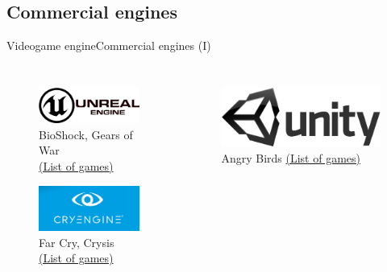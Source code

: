 \documentclass[10pt,compress]{beamer} %
\begin{document}
\subsection{Commercial engines}
\begin{frame}{Videogame engine}{Commercial engines (I)}
	\vspace{-0.2cm}
    \begin{columns}
		\vspace{-0.2cm}
   	 	\begin{figure}[t]
		\begin{center}
		    \includegraphics[width=0.8\linewidth]{figs/unreal}\\
			\small{BioShock, Gears of War\\
			\href{https://en.wikipedia.org/wiki/List_of_Unreal_Engine_games}{(List of games)}}

		    \includegraphics[width=0.8\linewidth]{figs/CRYENGINE}\\
			\small{Far Cry, Crysis\\
			\href{https://en.wikipedia.org/wiki/List_of_CryEngine_games}{(List of games)}
			}
		\end{center}
   	 	\end{figure}
		\vspace{-0.3cm}
   	 	\begin{figure}[t]
		\begin{center}
		    \includegraphics[width=0.8\linewidth]{figs/unity}\\
			\small{Angry Birds 
			\href{https://en.wikipedia.org/wiki/List_of_Unity_games}{(List of games)}
			}
		

\end{center}
\end{figure}
\end{columns}
\end{frame}
\end{document}
